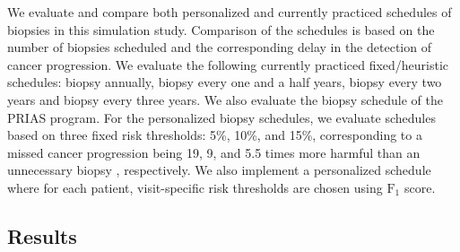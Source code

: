 We evaluate and compare both personalized and currently practiced schedules of biopsies in this simulation study. Comparison of the schedules is based on the number of biopsies scheduled and the corresponding delay in the detection of cancer progression. We evaluate the following currently practiced fixed/heuristic schedules: biopsy annually, biopsy every one and a half years, biopsy every two years and biopsy every three years. We also evaluate the biopsy schedule of the PRIAS program. For the personalized biopsy schedules, we evaluate schedules based on three fixed risk thresholds: 5\%, 10\%, and 15\%, corresponding to a missed cancer progression being 19, 9, and 5.5 times more harmful than an unnecessary biopsy \cite{vickers2006decision}, respectively. We also implement a personalized schedule where for each patient, visit-specific risk thresholds are chosen using $\mbox{F}_1$ score.

\subsection{Results}